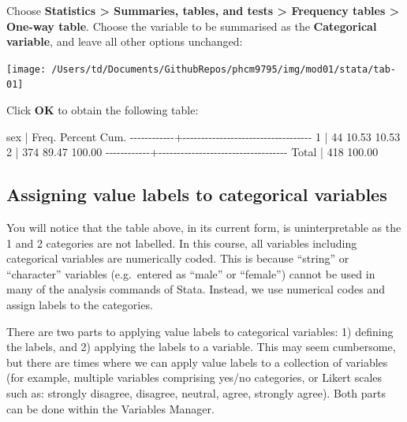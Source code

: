 \documentclass[
]{memoir}
\newenvironment{Shaded}{\begin{snugshade}}{\end{snugshade}}
\newcommand{\NormalTok}[1]{#1}
\begin{document}
Choose \textbf{Statistics \textgreater{} Summaries, tables, and tests \textgreater{} Frequency tables \textgreater{} One-way table}. Choose the variable to be summarised as the \textbf{Categorical variable}, and leave all other options unchanged:

\texttt{[image: /Users/td/Documents/GithubRepos/phcm9795/img/mod01/stata/tab-01]}

Click \textbf{OK} to obtain the following table:

\begin{Shaded}
\begin{Highlighting}[]
\NormalTok{        sex |      Freq.     Percent        Cum.}
\NormalTok{{-}{-}{-}{-}{-}{-}{-}{-}{-}{-}{-}{-}+{-}{-}{-}{-}{-}{-}{-}{-}{-}{-}{-}{-}{-}{-}{-}{-}{-}{-}{-}{-}{-}{-}{-}{-}{-}{-}{-}{-}{-}{-}{-}{-}{-}{-}{-}}
\NormalTok{          1 |         44       10.53       10.53}
\NormalTok{          2 |        374       89.47      100.00}
\NormalTok{{-}{-}{-}{-}{-}{-}{-}{-}{-}{-}{-}{-}+{-}{-}{-}{-}{-}{-}{-}{-}{-}{-}{-}{-}{-}{-}{-}{-}{-}{-}{-}{-}{-}{-}{-}{-}{-}{-}{-}{-}{-}{-}{-}{-}{-}{-}{-}}
\NormalTok{      Total |        418      100.00}
\end{Highlighting}
\end{Shaded}

\hypertarget{assigning-value-labels-to-categorical-variables}{%
\subsection{Assigning value labels to categorical variables}\label{assigning-value-labels-to-categorical-variables}}

You will notice that the table above, in its current form, is uninterpretable as the 1 and 2 categories are not labelled. In this course, all variables including categorical variables are numerically coded. This is because ``string'' or ``character'' variables (e.g.~entered as ``male'' or ``female'') cannot be used in many of the analysis commands of Stata. Instead, we use numerical codes and assign labels to the categories.

There are two parts to applying value labels to categorical variables: 1) defining the labels, and 2) applying the labels to a variable. This may seem cumbersome, but there are times where we can apply value labels to a collection of variables (for example, multiple variables comprising yes/no categories, or Likert scales such as: strongly disagree, disagree, neutral, agree, strongly agree). Both parts can be done within the Variables Manager.
\end{document}

